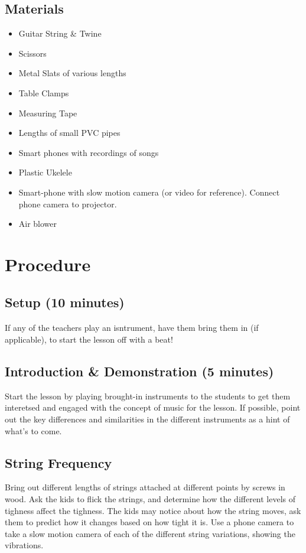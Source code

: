 \documentclass{lessonplan}
\begin{document}
    \subsection{Materials}
      \begin{itemize}
        \item Guitar String & Twine
        \item Scissors
        \item Metal Slats of various lengths
        \item Table Clamps
        \item Measuring Tape
        \item Lengths of small PVC pipes
        \item Smart phones with recordings of songs
        \item Plastic Ukelele
        \item Smart-phone with slow motion camera (or video for reference). Connect phone camera to projector.
        \item Air blower
      \end{itemize}
  \section{Procedure}
    \subsection{Setup (10 minutes)}

      \paragraph{}
            If any of the teachers play an isntrument, have them bring them in (if applicable), 
      to start the lesson off with a beat! 

    \subsection{Introduction & Demonstration (5 minutes)}
      Start the lesson by playing brought-in instruments to the students to get them interetsed
       and engaged with the concept of music for the lesson. If possible,
        point out the key differences and similarities
        in the different instruments as a hint of what's to come.
    \subsection{String Frequency}
      Bring out different lengths of strings attached at different points by screws in wood. Ask the kids 
      to flick the strings, and determine how the different levels of tighness affect the tighness. 
      The kids may notice about how the string moves, ask them to predict how it changes based on how tight it is.
      Use a phone camera to take a slow motion camera of each of the different string variations, showing the vibrations.
\end{document}
